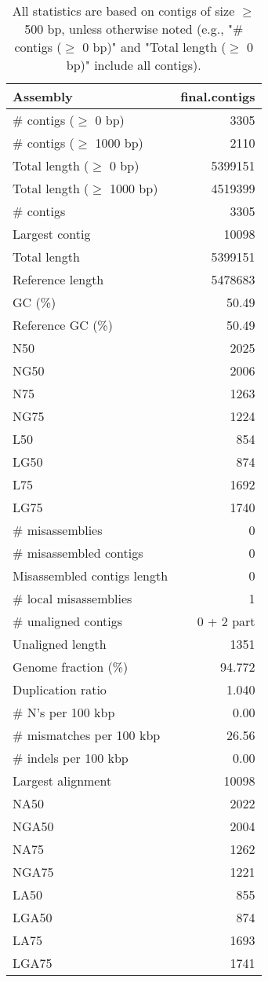 \documentclass[12pt,a4paper]{article}
\begin{document}
\begin{table}[ht]
\begin{center}
\caption{All statistics are based on contigs of size $\geq$ 500 bp, unless otherwise noted (e.g., "\# contigs ($\geq$ 0 bp)" and "Total length ($\geq$ 0 bp)" include all contigs).}
\begin{tabular}{|l*{1}{|r}|}
\hline
Assembly & final.contigs \\ \hline
\# contigs ($\geq$ 0 bp) & 3305 \\ \hline
\# contigs ($\geq$ 1000 bp) & 2110 \\ \hline
Total length ($\geq$ 0 bp) & 5399151 \\ \hline
Total length ($\geq$ 1000 bp) & 4519399 \\ \hline
\# contigs & 3305 \\ \hline
Largest contig & 10098 \\ \hline
Total length & 5399151 \\ \hline
Reference length & 5478683 \\ \hline
GC (\%) & 50.49 \\ \hline
Reference GC (\%) & 50.49 \\ \hline
N50 & 2025 \\ \hline
NG50 & 2006 \\ \hline
N75 & 1263 \\ \hline
NG75 & 1224 \\ \hline
L50 & 854 \\ \hline
LG50 & 874 \\ \hline
L75 & 1692 \\ \hline
LG75 & 1740 \\ \hline
\# misassemblies & 0 \\ \hline
\# misassembled contigs & 0 \\ \hline
Misassembled contigs length & 0 \\ \hline
\# local misassemblies & 1 \\ \hline
\# unaligned contigs & 0 + 2 part \\ \hline
Unaligned length & 1351 \\ \hline
Genome fraction (\%) & 94.772 \\ \hline
Duplication ratio & 1.040 \\ \hline
\# N's per 100 kbp & 0.00 \\ \hline
\# mismatches per 100 kbp & 26.56 \\ \hline
\# indels per 100 kbp & 0.00 \\ \hline
Largest alignment & 10098 \\ \hline
NA50 & 2022 \\ \hline
NGA50 & 2004 \\ \hline
NA75 & 1262 \\ \hline
NGA75 & 1221 \\ \hline
LA50 & 855 \\ \hline
LGA50 & 874 \\ \hline
LA75 & 1693 \\ \hline
LGA75 & 1741 \\ \hline
\end{tabular}
\end{center}
\end{table}
\end{document}
